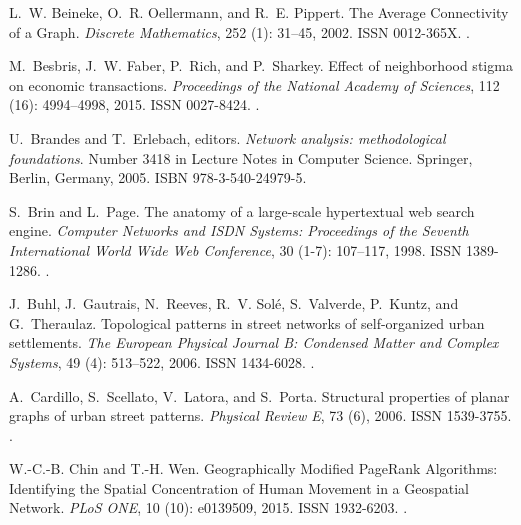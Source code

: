 \documentclass[Afour,sageh,times]{sagej}
\begin{document}
\begin{thebibliography}{54}
	L.~W. Beineke, O.~R. Oellermann, and R.~E. Pippert.
	\newblock The {Average} {Connectivity} of a {Graph}.
	\newblock \emph{Discrete Mathematics}, 252 (1): 31--45, 2002.
	\newblock ISSN 0012-365X.
	\newblock {}.
	
	M.~Besbris, J.~W. Faber, P.~Rich, and P.~Sharkey.
	\newblock Effect of neighborhood stigma on economic transactions.
	\newblock \emph{Proceedings of the National Academy of Sciences}, 112
	(16): 4994--4998, 2015.
	\newblock ISSN 0027-8424.
	\newblock {}.
	
	U.~Brandes and T.~Erlebach, editors.
	\newblock \emph{Network analysis: methodological foundations}.
	\newblock Number 3418 in Lecture {Notes} in {Computer} {Science}. Springer,
	Berlin, Germany, 2005.
	\newblock ISBN 978-3-540-24979-5.
	
	S.~Brin and L.~Page.
	\newblock The anatomy of a large-scale hypertextual web search engine.
	\newblock \emph{Computer Networks and ISDN Systems: Proceedings of the Seventh
		International World Wide Web Conference}, 30 (1-7):
	107--117, 1998.
	\newblock ISSN 1389-1286.
	\newblock {}.
	
	J.~Buhl, J.~Gautrais, N.~Reeves, R.~V. Solé, S.~Valverde, P.~Kuntz, and
	G.~Theraulaz.
	\newblock Topological patterns in street networks of self-organized urban
	settlements.
	\newblock \emph{The European Physical Journal B: Condensed Matter and Complex
		Systems}, 49 (4): 513--522, 2006.
	\newblock ISSN 1434-6028.
	\newblock {}.
	
	A.~Cardillo, S.~Scellato, V.~Latora, and S.~Porta.
	\newblock Structural properties of planar graphs of urban street patterns.
	\newblock \emph{Physical Review E}, 73 (6), 2006.
	\newblock ISSN 1539-3755.
	\newblock {}.
	
	W.-C.-B. Chin and T.-H. Wen.
	\newblock Geographically {Modified} {PageRank} {Algorithms}: {Identifying} the
	{Spatial} {Concentration} of {Human} {Movement} in a {Geospatial} {Network}.
	\newblock \emph{PLoS ONE}, 10 (10): e0139509, 2015.
	\newblock ISSN 1932-6203.
	\newblock {}.
	

\end{thebibliography}
\end{document}
